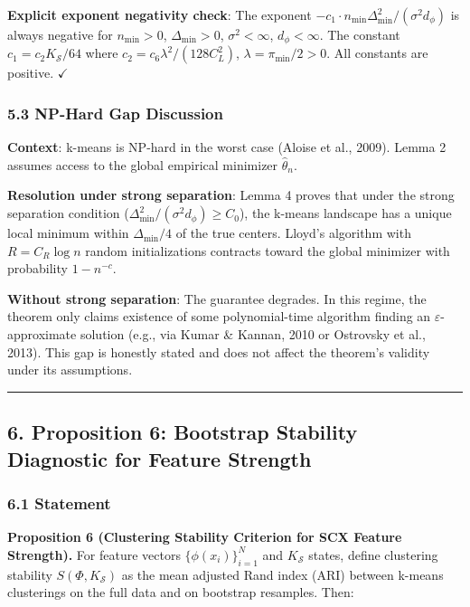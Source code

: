 \documentclass[
  12pt,
]{ctexart}
\begin{document}
\textbf{Explicit exponent negativity check}: The exponent
\(-c_1 \cdot n_{\min} \Delta_{\min}^2/(\sigma^2 d_\phi)\) is always
negative for \(n_{\min} > 0\), \(\Delta_{\min} > 0\),
\(\sigma^2 < \infty\), \(d_\phi < \infty\). The constant
\(c_1 = c_2 K_{\mathcal{S}}/64\) where
\(c_2 = c_6 \lambda^2/(128 C_L^2)\), \(\lambda = \pi_{\min}/2 > 0\). All
constants are positive. \(\checkmark\)

\subsubsection{5.3 NP-Hard Gap Discussion}\label{np-hard-gap-discussion}

\textbf{Context}: k-means is NP-hard in the worst case (Aloise et al.,
2009). Lemma 2 assumes access to the global empirical minimizer
\(\hat{\theta}_n\).

\textbf{Resolution under strong separation}: Lemma 4 proves that under
the strong separation condition
(\(\Delta_{\min}^2/(\sigma^2 d_\phi) \geq C_0\)), the k-means landscape
has a unique local minimum within \(\Delta_{\min}/4\) of the true
centers. Lloyd's algorithm with \(R = C_R \log n\) random
initializations contracts toward the global minimizer with probability
\(1 - n^{-c}\).

\textbf{Without strong separation}: The guarantee degrades. In this
regime, the theorem only claims existence of some polynomial-time
algorithm finding an \(\varepsilon\)-approximate solution (e.g., via
Kumar \& Kannan, 2010 or Ostrovsky et al., 2013). This gap is honestly
stated and does not affect the theorem's validity under its assumptions.

\begin{center}\rule{0.5\linewidth}{0.5pt}\end{center}

\subsection{6. Proposition 6: Bootstrap Stability Diagnostic for Feature
Strength}\label{proposition-6-bootstrap-stability-diagnostic-for-feature-strength}

\subsubsection{6.1 Statement}\label{statement}

\textbf{Proposition 6 (Clustering Stability Criterion for SCX Feature
Strength).} For feature vectors \(\{\phi(x_i)\}_{i=1}^N\) and
\(K_{\mathcal{S}}\) states, define clustering stability
\(S(\Phi, K_{\mathcal{S}})\) as the mean adjusted Rand index (ARI)
between k-means clusterings on the full data and on bootstrap resamples.
Then:
\end{document}
